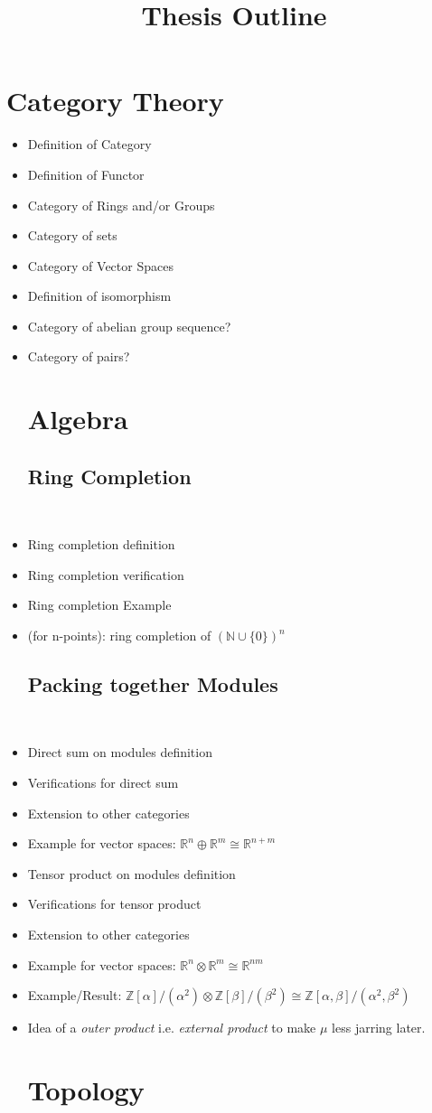 \documentclass[12]{amsart}
\newcommand{\iso}{\cong} %
\newcommand{\set}[1]{\{#1\}}
\newcommand{\N}{\mathbb{N}}
\newcommand{\R}{\mathbb{R}}
\newcommand{\Z}{\mathbb{Z}}
\newcommand{\op}{\oplus}
\newcommand{\ot}{\otimes}
\newcommand{\itemc}{\item[\checkmark]}
\newcommand{\itemo}{\item[$\circ$]}
\begin{document}
\title{Thesis Outline}
\maketitle

\section{Category Theory}%
\begin{itemize}
    \itemc Definition of Category
    \itemc Definition of Functor
    \itemc Category of Rings and/or Groups
    \itemo Category of sets
    \itemc Category of Vector Spaces 
    \itemc Definition of isomorphism
    \itemo Category of abelian group sequence?
    \itemo Category of pairs?

\section{Algebra}%
\subsection{Ring Completion}~
	\itemc Ring completion definition
	\itemc Ring completion verification
	\itemc Ring completion Example 
    \itemo (for n-points): ring completion of $(\N \cup \set{0})^n$
\subsection{Packing together Modules}~
    \itemc Direct sum on modules definition
    \item Verifications for direct sum
    \item Extension to other categories
    \item Example for vector spaces: $\R^n \op \R^m \iso \R^{n+m}$
    \itemc Tensor product on modules definition
	\item Verifications for tensor product
    \item Extension to other categories 
    \item Example for vector spaces: $\R^n \ot \R^m \iso \R^{nm}$
    \itemo Example/Result: $\Z[\alpha]/(\alpha^2)\ot\Z[\beta]/(\beta^2) \iso 
    		   \Z[\alpha,\beta]/(\alpha^2,\beta^2)$  
    \itemo Idea of a \emph{outer product} i.e. \emph{external product} to make $\mu$ less jarring later.  

\section{Topology}%

\end{itemize}
\end{document}
